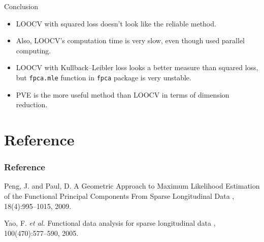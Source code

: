 \documentclass{beamer}
\begin{document}
\begin{frame}{Conclusion}
	\begin{itemize}
		\item {
			LOOCV with squared loss doesn't look like the reliable method.
		}	
		\item {
			Also, LOOCV's computation time is very slow, even though used parallel computing.
		}	
		\item {
			LOOCV with Kullback–Leibler loss looks a better measure than squared loss, but \texttt{fpca.mle} function in \texttt{fpca} package is very unstable.
		}
		\item {
			PVE is the more useful method than LOOCV in terms of dimension reduction.
		}
	\end{itemize}
\end{frame}


\appendix
\section{Reference}
\begin{frame}
  \frametitle<presentation>{Reference}
    
  \begin{thebibliography}{10}
  	\beamertemplatearticlebibitems
  	Peng, J. and Paul, D.
  	\newblock A Geometric Approach to Maximum Likelihood Estimation of the Functional Principal Components From Sparse Longitudinal Data
  	, 18(4):995--1015,
  	2009.
		
   	\beamertemplatearticlebibitems
		Yao, F. \textit{et al.}
		\newblock Functional data analysis for sparse longitudinal data
		, 100(470):577--590,
		2005.
  \end{thebibliography}
\end{frame}


%
%    
%    
%
% 
%    
%
\end{document}

